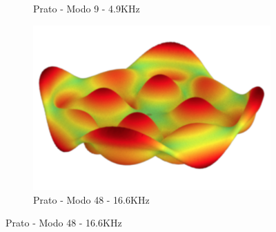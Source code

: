 \begin{figure}[ht]
\begin{subfigure}{0.32\textwidth}
	\caption{Prato - Modo 9 - 4.9KHz}\label{fig:plates_9}
\end{subfigure}%
\begin{subfigure}{0.32\textwidth}
	\centering
	\includegraphics[height=0.15\textheight]{mathematicalbackground/modes/plate_48.png}
	\caption{Prato - Modo 48 - 16.6KHz}\label{fig:plates_48}
\end{subfigure}%


\end{figure}
